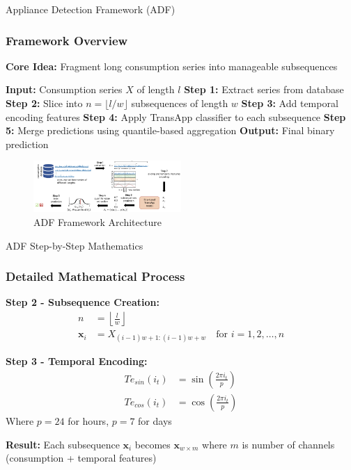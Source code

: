 \documentclass{beamer}
\begin{document}
\begin{frame}{Appliance Detection Framework (ADF)}
\frametitle{Framework Overview}

\textbf{Core Idea:} Fragment long consumption series into manageable subsequences

\begin{algorithm}[H]
\caption{ADF Framework}
\begin{algorithmic}[1]
\STATE \textbf{Input:} Consumption series $X$ of length $l$
\STATE \textbf{Step 1:} Extract series from database
\STATE \textbf{Step 2:} Slice into $n = \lfloor l/w \rfloor$ subsequences of length $w$
\STATE \textbf{Step 3:} Add temporal encoding features
\STATE \textbf{Step 4:} Apply TransApp classifier to each subsequence
\STATE \textbf{Step 5:} Merge predictions using quantile-based aggregation
\STATE \textbf{Output:} Final binary prediction
\end{algorithmic}
\end{algorithm}

\vspace{0.5cm}
\begin{center}
\begin{figure}[h]
\centering
\includegraphics[width=0.5\textwidth]{adf.png}
\caption{ADF Framework Architecture}
\end{figure}
\end{center}

\end{frame}

\begin{frame}{ADF Step-by-Step Mathematics}
\frametitle{Detailed Mathematical Process}

\textbf{Step 2 - Subsequence Creation:}
\begin{align}
n &= \left\lfloor \frac{l}{w} \right\rfloor \\
\mathbf{x}_i &= X_{(i-1)w+1:(i-1)w+w} \quad \text{for } i = 1, 2, \ldots, n
\end{align}

\textbf{Step 3 - Temporal Encoding:}
\begin{align}
Te_{sin}(i_t) &= \sin\left(\frac{2\pi i_t}{p}\right) \\
Te_{cos}(i_t) &= \cos\left(\frac{2\pi i_t}{p}\right)
\end{align}
Where $p = 24$ for hours, $p = 7$ for days

\textbf{Result:} Each subsequence $\mathbf{x}_i$ becomes $\mathbf{x}_{w \times m}$ where $m$ is number of channels (consumption + temporal features)
\end{frame}
\end{document}
